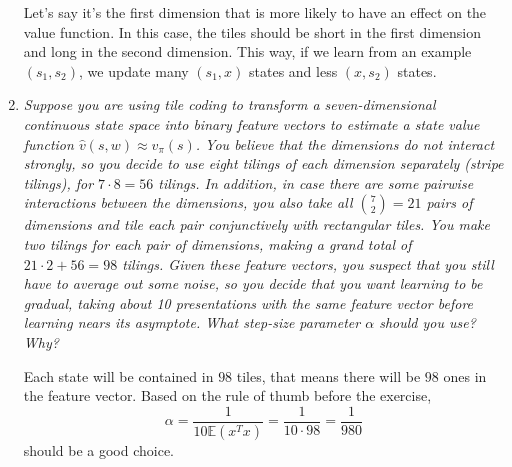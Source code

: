 \documentclass[12pt,a4paper]{article}
\begin{document}
\begin{enumerate}
  Let's say it's the first dimension that is more likely to have an effect on the value
  function. In this case, the tiles should be short in the first dimension and long in
  the second dimension. This way, if we learn from an example $(s_1, s_2)$, we update
  many $(s_1, x)$ states and less $(x, s_2)$ states.

  \item \textit{Suppose you are using tile coding to transform a seven-dimensional continuous
  state space into binary feature vectors to estimate a state value function
  $\hat{v}(s,w) \approx v_\pi(s)$. You believe that the dimensions do not interact strongly,
  so you decide to use eight tilings of each dimension separately (stripe tilings), for 
  $7 \cdot 8 = 56$ tilings. In addition, in case there are some pairwise interactions between
  the dimensions, you also take all $\binom{7}{2} = 21$ pairs of dimensions and tile each
  pair conjunctively with rectangular tiles. You make two tilings for each pair of dimensions,
  making a grand total of $21 \cdot 2 + 56 = 98$ tilings. Given these feature vectors, you suspect
  that you still have to average out some noise, so you decide that you want learning to be
  gradual, taking about 10 presentations with the same feature vector before learning nears
  its asymptote. What step-size parameter $\alpha$ should you use? Why?}

  Each state will be contained in $98$ tiles, that means there will be $98$ ones in the feature vector.
  Based on the rule of thumb before the exercise,
  \[\alpha = \frac{1}{10 \mathbb{E}(x^Tx)} = \frac{1}{10 \cdot 98} = \frac{1}{980}\]
  should be a good choice.
\end{enumerate}
\end{document}

